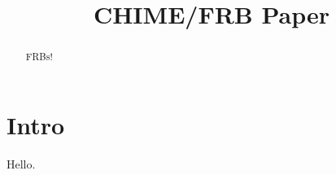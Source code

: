 \documentclass{aastex63}
\begin{document}
\title{CHIME/FRB Paper}




\begin{abstract}
FRBs!
\end{abstract}


\section{Intro}

Hello.

\acknowledgments

\allacks
\end{document}
